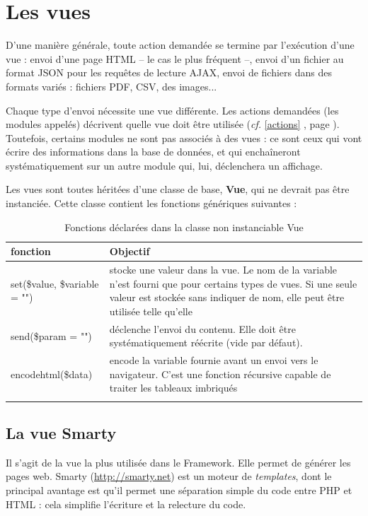 \chapter{Les vues}\label{vue}

D'une manière générale, toute action demandée se termine par l'exécution d'une vue : envoi d'une page HTML -- le cas le plus fréquent --, envoi d'un fichier au format JSON pour les requêtes de lecture AJAX, envoi de fichiers dans des formats variés : fichiers PDF, CSV, des images...

Chaque type d'envoi nécessite une vue différente. Les actions demandées (les modules appelés) décrivent quelle vue doit être utilisée (\textit{cf.} \ref{actions} \textit{}, page \pageref{actions}). Toutefois, certains modules ne sont pas associés à des vues : ce sont ceux qui vont écrire des informations dans la base de données, et qui enchaîneront systématiquement sur un autre module qui, lui, déclenchera un affichage.

Les vues sont toutes héritées d'une classe de base, \textbf{Vue}, qui ne devrait pas être instanciée. Cette classe contient les fonctions génériques suivantes :

\begin{longtable}{|p{5cm}|p{8cm}|}
\hline
\textbf{fonction} & \textbf{Objectif} \\
\hline
\endhead

set(\$value, \$variable = "") & stocke une valeur dans la vue. Le nom de la variable n'est fourni que pour certains types de vues. Si une seule valeur est stockée sans indiquer de nom, elle peut être utilisée telle qu'elle \\

send(\$param = "") & déclenche l'envoi du contenu. Elle doit être systématiquement réécrite (vide par défaut). \\

encodehtml(\$data) & encode la variable fournie avant un envoi vers le navigateur. C'est une fonction récursive capable de traiter les tableaux imbriqués \\
\hline

\caption{Fonctions déclarées dans la classe non instanciable Vue}
\end{longtable}

\section{La vue Smarty}

Il s'agit de la vue la plus utilisée dans le Framework. Elle permet de générer les pages web. Smarty (\url{http://smarty.net}) est un moteur de \textit{templates}, dont le principal avantage est qu'il permet une séparation simple du code entre PHP et HTML : cela simplifie l'écriture et la relecture du code.

